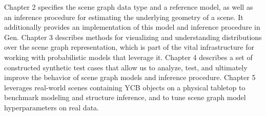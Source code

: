 Chapter 2 specifies the scene graph data type and a reference model, as well as an inference procedure for estimating the underlying geometry of a scene.
It additionally provides an implementation of this model and inference procedure in Gen.
Chapter 3 describes methods for visualizing and understanding distributions over the scene graph representation, which is part of the vital infrastructure for working with probabilistic models that leverage it.
Chapter 4 describes a set of constructed synthetic test cases that allow us to analyze, test, and ultimately improve the behavior of scene graph models and inference procedure.
Chapter 5 leverages real-world scenes containing YCB objects on a physical tabletop to benchmark modeling and structure inference, and to tune scene graph model hyperparameters on real data.
